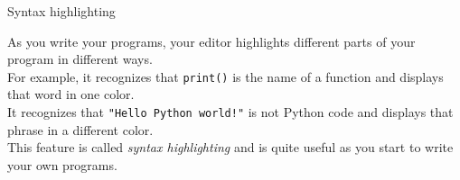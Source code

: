 \documentclass[aspectratio=169]{beamer}
\begin{document}
\begin{frame}{Syntax highlighting}
 
    As you write your programs, your editor highlights different parts of your program in different ways. \\
    \vspace{15pt}
    For example, it recognizes that \texttt{print()} is the name of a function and displays that word in one color. \\
    \vspace{15pt}
    It recognizes that \texttt{"Hello Python world!"} is not Python code and displays that phrase in a different color. \\
    \vspace{15pt}
    This feature is called \textit{syntax highlighting} and is quite useful as you start to write your own programs.
\end{frame}
\end{document}
